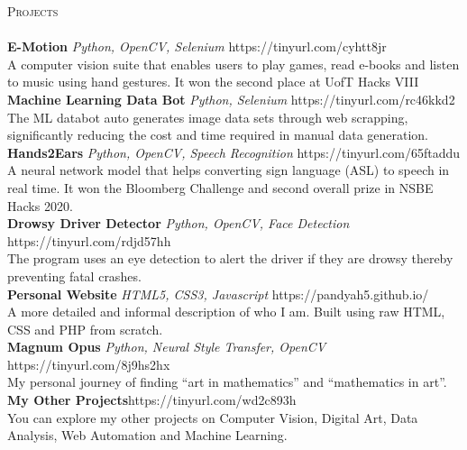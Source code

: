 \documentclass[a4paper]{article}
\newcommand{\lineunder} {
    \vspace*{-8pt} \\
    \hspace*{-18pt} \hrulefill \\
}
\newcommand{\header} [1] {
    {\hspace*{-18pt}\vspace*{6pt} \textsc{#1}}
    \vspace*{-6pt} \lineunder
}
\begin{document}
\header{Projects}
{\textbf{E-Motion}} {\sl Python, OpenCV, Selenium} \hfill https://tinyurl.com/cyhtt8jr\\
A computer vision suite that enables users to play games, read e-books and listen to music using hand gestures. It won the second place at UofT Hacks VIII\\
\vspace*{2mm}
{\textbf{Machine Learning Data Bot}} {\sl Python, Selenium} \hfill https://tinyurl.com/rc46kkd2\\
The ML databot auto generates image data sets through web scrapping, significantly reducing the cost and time required in manual data generation.\\
\vspace*{2mm}
{\textbf{Hands2Ears}} {\sl Python, OpenCV, Speech Recognition} \hfill https://tinyurl.com/65ftaddu\\
A neural network model that helps converting sign language (ASL) to speech in real time. It won the Bloomberg Challenge and second overall prize in NSBE Hacks 2020.\\
\vspace*{2mm}
{\textbf{Drowsy Driver Detector}} {\sl Python, OpenCV, Face Detection} \hfill https://tinyurl.com/rdjd57hh\\
The program uses an eye detection to alert the driver if they are drowsy thereby preventing fatal crashes.\\
\vspace*{2mm}
{\textbf{Personal Website}} {\sl HTML5, CSS3, Javascript} \hfill https://pandyah5.github.io/\\
A more detailed and informal description of who I am. Built using raw HTML, CSS and PHP from scratch.\\
\vspace*{2mm}
{\textbf{Magnum Opus}} {\sl Python, Neural Style Transfer, OpenCV} \hfill https://tinyurl.com/8j9hs2hx\\
My personal journey of finding “art in mathematics” and “mathematics in art”.\\
\vspace*{2mm}
{\textbf{My Other Projects}}\hfill https://tinyurl.com/wd2c893h\\
You can explore my other projects on Computer Vision, Digital Art, Data Analysis, Web Automation and Machine Learning.\\
\vspace*{2mm}
\end{document}
